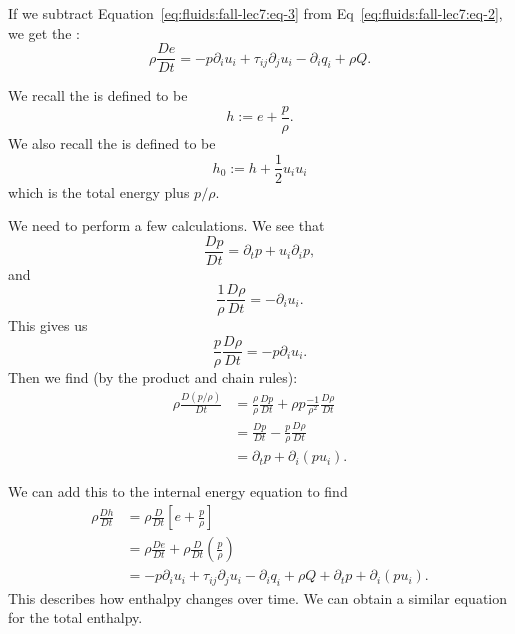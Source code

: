 \begin{node}
If we subtract Equation~\ref{eq:fluids:fall-lec7:eq-3} from Eq~\eqref{eq:fluids:fall-lec7:eq-2},
we get the :
\begin{equation}
\rho\frac{D e}{D t}=-p\partial_{i}u_{i}+\tau_{ij}\partial_{j}u_{i}-\partial_{i}q_{i}
+\rho Q.
\end{equation}
\end{node}

\begin{definition}
We recall the  is defined to be
\begin{equation}
h := e + \frac{p}{\rho}.
\end{equation}
We also recall the  is defined to be
\begin{equation}
h_{0} := h + \frac{1}{2}u_{i}u_{i}
\end{equation}
which is the total energy plus $p/\rho$.
\end{definition}

\begin{node}
We need to perform a few calculations. We see that
\begin{equation}
\frac{D p}{D t}=\partial_{t}p+u_{i}\partial_{i}p,
\end{equation}
and
\begin{equation}
\frac{1}{\rho}\frac{D\rho}{D t}=-\partial_{i}u_{i}.
\end{equation}
This gives us
\begin{equation}
\frac{p}{\rho}\frac{D\rho}{D t}=-p\partial_{i}u_{i}.
\end{equation}
Then we find (by the product and chain rules):
\begin{subequations}
  \begin{align}
\rho\frac{D(p/\rho)}{D t}
&=\frac{\rho}{\rho}\frac{D p}{D t}+\rho p\frac{-1}{\rho^{2}}\frac{D\rho}{D t}\\
&=\frac{D p}{D t}-\frac{p}{\rho}\frac{D\rho}{D t}\\
&=\partial_{t}p+\partial_{i}(pu_{i}).
  \end{align}
\end{subequations}
\end{node}

\begin{node}
We can add this to the internal energy equation to find
\begin{subequations}
  \begin{align}
\rho\frac{D h}{D t}
&=\rho\frac{D}{D t}[e + \frac{p}{\rho}]\\
&=\rho\frac{D e}{D t}+\rho\frac{D}{D t}\left(\frac{p}{\rho}\right)\\
&=-p\partial_{i}u_{i}+\tau_{ij}\partial_{j}u_{i}-\partial_{i}q_{i}+\rho Q
+\partial_{t}p+\partial_{i}(pu_{i}).
  \end{align}
\end{subequations}
This describes how enthalpy changes over time. We can obtain a similar
equation for the total enthalpy.
\end{node}

